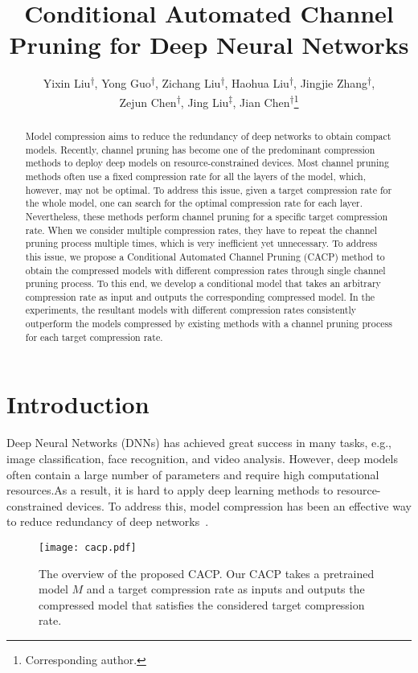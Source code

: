 \documentclass[letterpaper]{article} %
\title{Conditional Automated Channel Pruning for Deep Neural Networks}
\author{
    Yixin Liu\textsuperscript{$\dag$}, Yong Guo\textsuperscript{$\dag$}, Zichang Liu\textsuperscript{$\dag$}, Haohua Liu\textsuperscript{$\dag$}, Jingjie Zhang\textsuperscript{$\dag$}, \\Zejun Chen\textsuperscript{$\dag$}, Jing Liu\textsuperscript{$\ddag$}, Jian Chen\textsuperscript{$\dag$}\thanks{Corresponding author.}
    \\
}
\begin{document}
\maketitle

\begin{abstract}
{
Model compression aims to reduce the redundancy of deep networks to obtain compact models. Recently, channel pruning has become one of the predominant compression methods to deploy deep models on resource-constrained devices. Most channel pruning methods often use a fixed compression rate for all the layers of the model, which, however, may not be optimal. To address this issue, given a target compression rate for the whole model, one can search for the optimal compression rate for each layer. Nevertheless, these methods perform channel pruning for a specific target compression rate. When we consider multiple compression rates, they have to repeat the channel pruning process multiple times, which is very inefficient yet unnecessary. To address this issue, we propose a Conditional Automated Channel Pruning (CACP) method to obtain the compressed models with different compression rates through single channel pruning process. To this end, we develop a conditional model that takes an arbitrary compression rate as input and outputs the corresponding compressed model. In the experiments, the resultant models with different compression rates consistently outperform the models compressed by existing methods with a channel pruning process for each target compression rate.
}
\end{abstract}


\section{Introduction}
Deep Neural Networks (DNNs) has achieved great success in many tasks, e.g., image classification, face recognition, and video analysis. 
However, deep models often contain a large number of parameters and require high computational resources.As a result, it is hard to apply deep learning methods to resource-constrained devices. To address this, model compression has been an effective way to reduce redundancy of deep networks~\cite{zhuang2018discrimination,guo2019nat}. 

\begin{figure}[t]
    \centering
    \texttt{[image: cacp.pdf]}
    \caption{The overview of the proposed CACP. Our CACP takes a pretrained model $M$ and a target compression rate as inputs and outputs the compressed model that satisfies the considered target compression rate.}
    \label{fig:overview}
\end{figure}
\end{document}
